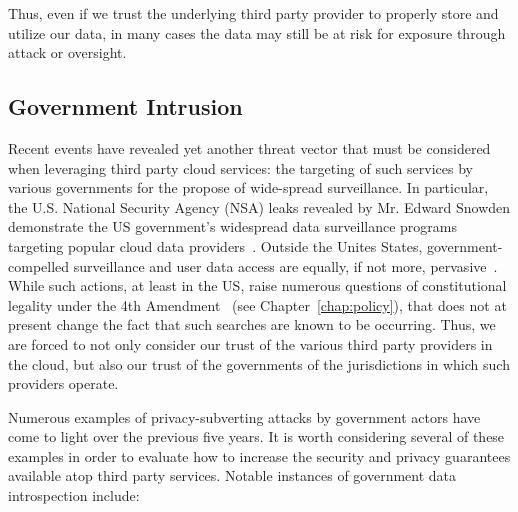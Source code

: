 Thus, even if we trust the underlying third party provider to properly
store and utilize our data, in many cases the data may still be at
risk for exposure through attack or oversight.

\subsection{Government Intrusion}

Recent events have revealed yet another threat vector that must be
considered when leveraging third party cloud services: the targeting
of such services by various governments for the propose of wide-spread
surveillance. In particular, the U.S. National Security Agency (NSA)
leaks revealed by Mr. Edward Snowden demonstrate the US government's
widespread data surveillance programs targeting popular cloud data
providers~\cite{greenwald-prism}.  Outside the Unites States,
government-compelled surveillance and user data access are equally, if
not more, pervasive~\cite{netfreedom2015}.  While such actions, at
least in the US, raise numerous questions of constitutional legality
under the 4th Amendment~\cite{us-constitution-amend4} (see
Chapter~\ref{chap:policy}), that does not at present change the fact
that such searches are known to be occurring. Thus, we are forced to
not only consider our trust of the various third party providers in
the cloud, but also our trust of the governments of the jurisdictions
in which such providers operate.

Numerous examples of privacy-subverting attacks by government actors
have come to light over the previous five years. It is worth
considering several of these examples in order to evaluate how to
increase the security and privacy guarantees available atop third
party services. Notable instances of government data introspection
include:

